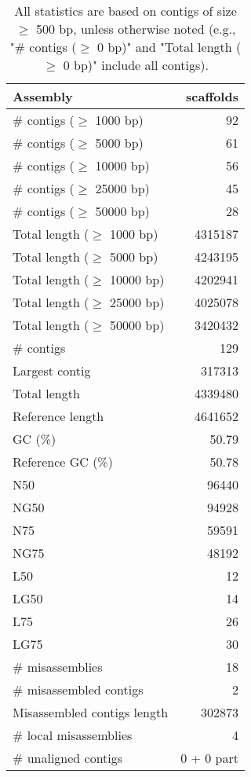 \documentclass[12pt,a4paper]{article}
\begin{document}
\begin{table}[ht]
\begin{center}
\caption{All statistics are based on contigs of size $\geq$ 500 bp, unless otherwise noted (e.g., "\# contigs ($\geq$ 0 bp)" and "Total length ($\geq$ 0 bp)" include all contigs).}
\begin{tabular}{|l*{1}{|r}|}
\hline
Assembly & scaffolds \\ \hline
\# contigs ($\geq$ 1000 bp) & 92 \\ \hline
\# contigs ($\geq$ 5000 bp) & 61 \\ \hline
\# contigs ($\geq$ 10000 bp) & 56 \\ \hline
\# contigs ($\geq$ 25000 bp) & 45 \\ \hline
\# contigs ($\geq$ 50000 bp) & 28 \\ \hline
Total length ($\geq$ 1000 bp) & 4315187 \\ \hline
Total length ($\geq$ 5000 bp) & 4243195 \\ \hline
Total length ($\geq$ 10000 bp) & 4202941 \\ \hline
Total length ($\geq$ 25000 bp) & 4025078 \\ \hline
Total length ($\geq$ 50000 bp) & 3420432 \\ \hline
\# contigs & 129 \\ \hline
Largest contig & 317313 \\ \hline
Total length & 4339480 \\ \hline
Reference length & 4641652 \\ \hline
GC (\%) & 50.79 \\ \hline
Reference GC (\%) & 50.78 \\ \hline
N50 & 96440 \\ \hline
NG50 & 94928 \\ \hline
N75 & 59591 \\ \hline
NG75 & 48192 \\ \hline
L50 & 12 \\ \hline
LG50 & 14 \\ \hline
L75 & 26 \\ \hline
LG75 & 30 \\ \hline
\# misassemblies & 18 \\ \hline
\# misassembled contigs & 2 \\ \hline
Misassembled contigs length & 302873 \\ \hline
\# local misassemblies & 4 \\ \hline
\# unaligned contigs & 0 + 0 part \\ \hline

\end{tabular}
\end{center}
\end{table}
\end{document}
